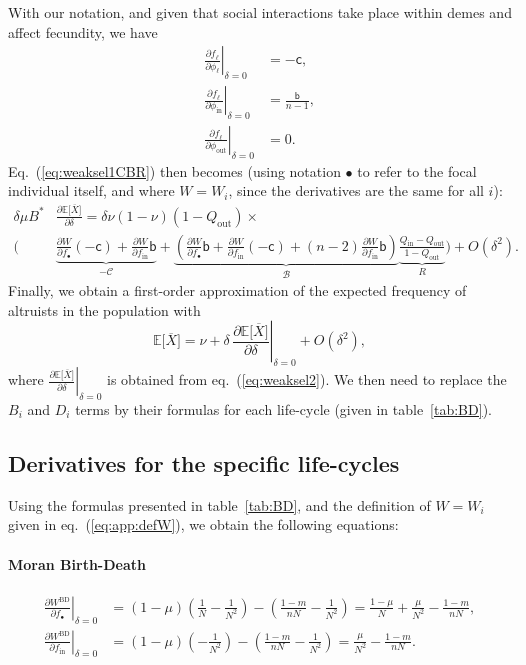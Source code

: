 \documentclass[11pt, letterpaper]{article}
\renewcommand{\eqref}[1]{\textup{{\normalfont eq.~(\ref{#1}}\normalfont)}}
\newcommand{\Eqref}[1]{Eq.~(\ref{#1})}
\newcommand{\deriv}[2]{\partial_{#2}\!{#1}\,}
\newcommand{\derivv}[3]{\left.\frac{\partial #1}{\partial #2}\right |_{#3=0}} %
\newcommand{\derivn}[2]{\frac{\partial #1}{\partial #2}}
\newcommand{\Esp}[1]{\mathbb{E}\big[ #1\big]}%
\newcommand{\bigO}[1]{O\left( #1 \right)}
\newcommand{\bb}{\mathsf{b}}
\newcommand{\cc}{\mathsf{c}}
\newcommand{\BD}{\textrm{BD}}
\newcommand{\mutbias}{\nu}
\newcommand{\inn}{\textrm{in}}
\newcommand{\out}{\textrm{out}}
\newcommand{\focal}{\bullet}
\newcommand{\selstr}{\delta}
\begin{document}
With our notation, and given that social interactions take place within demes and affect fecundity, we have
\begin{subequations}\label{eq:derivf}
\begin{align}
\derivv{f_{\ell}}{\phi_{\ell}}{\delta} & = -\cc,\\
\derivv{f_{\ell}}{\phi_{\inn}}{\delta} & = \frac{\bb}{n-1},\\
\derivv{f_{\ell}}{\phi_{\out}}{\delta} & = 0.
\end{align}
\end{subequations}
%
\Eqref{eq:weaksel1CBR} then becomes (using notation $\focal$ to refer to the focal individual itself, and where $W=W_i$, since the derivatives are the same for all $i$):
%
\begin{equation}\label{eq:weaksel2}
\begin{split}
\selstr \mu B^* & \derivn{\Esp{\overline{X}}}{\selstr} = \selstr  \mutbias (1-\mutbias) (1 - Q_{\out}) \times \\
 \Bigg( &\underbrace{ \derivn{W}{f_{\focal}} (-\cc) + \derivn{W}{f_{\inn}} \bb}_{-\mathcal{C}} + \underbrace{ \left( \derivn{W}{f_{\focal}} \bb + \derivn{W}{f_{\inn}} (-\cc) + (n-2) \derivn{W}{f_{\inn}} \bb \right) }_{\mathcal{B}} \underbrace{\frac{Q_{\inn} - Q_{\out}}{1 - Q_{\out}}}_{R} \Bigg)  + \bigO{\selstr^2}.
\end{split}
\end{equation}
Finally, we obtain a first-order approximation of the expected frequency of altruists in the population with 
\begin{equation}\label{eq:EXgeneric}
\Esp{\overline{X}} = \mutbias + \selstr \,  \derivv{\Esp{\overline{X}}}{\selstr}{\selstr} + \bigO{\selstr^2},
\end{equation}
where $\derivv{\Esp{\overline{X}}}{\selstr}{\selstr}$ is obtained from \eqref{eq:weaksel2}. We then need to replace the $B_{i}$ and $D_{i}$ terms by their formulas for each life-cycle (given in table~\ref{tab:BD}).

\subsection{Derivatives for the specific life-cycles}

Using the formulas presented in table~\ref{tab:BD}, and the definition of $W=W_i$ given in \eqref{eq:app:defW}, we obtain the following equations:

\paragraph{Moran Birth-Death}
\begin{subequations}\label{eq:dWBD}
\begin{align}
\derivv{W^{\BD}}{f_{\focal}}{\delta} &= (1-\mu) \left(\frac{1}{N} - \frac{1}{N^2}\right) - \left( \frac{1-m}{n N} - \frac{1}{N^2} \right) = \frac{1-\mu}{N} + \frac{\mu}{N^2} - \frac{1-m}{n N}, \\
\derivv{W^{\BD}}{f_{\inn}}{\delta} &= (1-\mu) \left(- \frac{1}{N^2}\right) - \left( \frac{1-m}{n N} - \frac{1}{N^2} \right) = \frac{\mu}{N^2} - \frac{1-m}{n N}.
\end{align}
\end{subequations}
\end{document}
